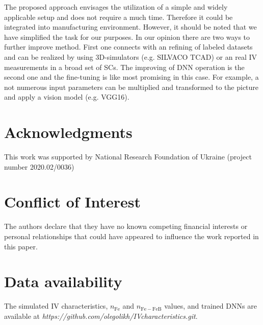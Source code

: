 \documentclass[num-refs]{wiley-article} %
\begin{document}
The proposed approach envisages
the utilization of a simple and widely applicable setup and
does not require a much time.
Therefore it could be integrated into manufacturing environment.
However, it should be noted that we have simplified the task for our purposes.
In our opinion there are two ways to further improve method.
First one connects with an refining of labeled datasets and can be realized by
using 3D-simulators (e.g. SILVACO TCAD) or an real IV measurements in a broad set of SCs.
The improving of DNN operation is the second one
and the fine-tuning is like most promising in this case.
For example,
a not numerous input parameters can be multiplied and transformed to the picture and
apply a vision model (e.g. VGG16).



\section*{Acknowledgments}
This work was supported by National Research Foundation  of Ukraine
(project number 2020.02/0036)

\section*{Conflict of Interest}
The authors declare that they have no known competing financial interests or
personal relationships that could have appeared to influence the work reported
in this paper.

\section*{Data availability}

The simulated IV characteristics, $n_\mathrm{Fe}$ and $n_\mathrm{Fe-FeB}$ values,
and trained DNNs are available
at \newline
\emph{https://github.com/olegolikh/IVcharacteristics.git}.

\end{document}
